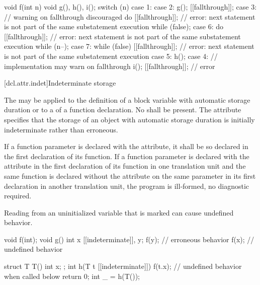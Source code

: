 \pnum
\begin{example}
\begin{codeblock}
void f(int n) {
  void g(), h(), i();
  switch (n) {
  case 1:
  case 2:
    g();
    [[fallthrough]];
  case 3:                       // warning on fallthrough discouraged
    do {
      [[fallthrough]];          // error: next statement is not part of the same substatement execution
    } while (false);
  case 6:
    do {
      [[fallthrough]];          // error: next statement is not part of the same substatement execution
    } while (n--);
  case 7:
    while (false) {
      [[fallthrough]];          // error: next statement is not part of the same substatement execution
    }
  case 5:
    h();
  case 4:                       // implementation may warn on fallthrough
    i();
    [[fallthrough]];            // error
  }
}
\end{codeblock}
\end{example}

[dcl.attr.indet]{Indeterminate storage}

\pnum
The   may be applied
to the definition of a block variable with automatic storage duration or
to a  of a function declaration.
No  shall be present.
The attribute specifies
that the storage of an object with automatic storage duration
is initially indeterminate rather than erroneous.

\pnum
If a function parameter is declared with the  attribute,
it shall be so declared in the first declaration of its function.
If a function parameter is declared with
the  attribute in the first declaration of its function
in one translation unit and
the same function is declared without the  attribute
on the same parameter in its first declaration in another translation unit,
the program is ill-formed, no diagnostic required.

\pnum
\begin{note}
Reading from an uninitialized variable
that is marked \tcode{[[indeterminate]]} can cause undefined behavior.
\begin{codeblock}
void f(int);
void g() {
  int x [[indeterminate]], y;
  f(y);                 // erroneous behavior
  f(x);                 // undefined behavior
}

struct T {
  T() {}
  int x;
};
int h(T t [[indeterminate]]) {
  f(t.x);               // undefined behavior when called below
  return 0;
}
int _ = h(T());
\end{codeblock}
\end{note}

